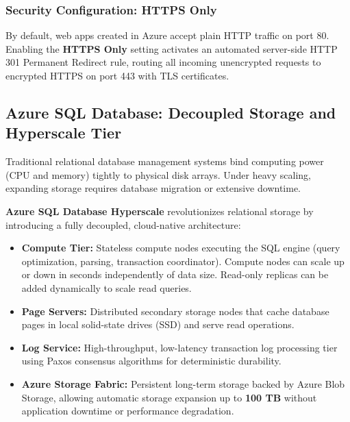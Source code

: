 \documentclass[11pt,a4paper,openany]{report}
\begin{document}
\subsubsection{Security Configuration: HTTPS Only}
By default, web apps created in Azure accept plain HTTP traffic on port 80. Enabling the \textbf{HTTPS Only} setting activates an automated server-side HTTP 301 Permanent Redirect rule, routing all incoming unencrypted requests to encrypted HTTPS on port 443 with TLS certificates.

\subsection{Azure SQL Database: Decoupled Storage and Hyperscale Tier}
Traditional relational database management systems bind computing power (CPU and memory) tightly to physical disk arrays. Under heavy scaling, expanding storage requires database migration or extensive downtime.

\textbf{Azure SQL Database Hyperscale} revolutionizes relational storage by introducing a fully decoupled, cloud-native architecture:
\begin{itemize}[leftmargin=*]
  \item \textbf{Compute Tier:} Stateless compute nodes executing the SQL engine (query optimization, parsing, transaction coordinator). Compute nodes can scale up or down in seconds independently of data size. Read-only replicas can be added dynamically to scale read queries.
  \item \textbf{Page Servers:} Distributed secondary storage nodes that cache database pages in local solid-state drives (SSD) and serve read operations.
  \item \textbf{Log Service:} High-throughput, low-latency transaction log processing tier using Paxos consensus algorithms for deterministic durability.
  \item \textbf{Azure Storage Fabric:} Persistent long-term storage backed by Azure Blob Storage, allowing automatic storage expansion up to \textbf{100 TB} without application downtime or performance degradation.
\end{itemize}
\end{document}
